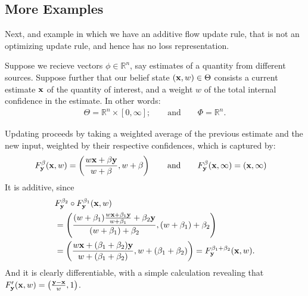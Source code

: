 \begin{subappendices}
    \section{More Examples}


    Next, and example in which we have an additive flow update rule,
    that is not an optimizing update rule, and hence has no loss representation.

    \begin{example}
        Suppose we recieve vectors $\phi \in \mathbb R^n$, 
        say estimates of a quantity from different sources.
        Suppose further that our belief state
        $(\mathbf x,w) \in \Theta$ consists a current estimate
        $\mathbf x$ of the quantity of interest, and a weight $w$ of the total internal confidence in the estimate.
        In other words:    
    	\begin{align*}
    		\Theta = \mathbb R^n \times [0,\infty];
    		\qquad
            \text{and}
            \qquad
    		\Phi = \mathbb R^n %
            .
    	\end{align*}

    	Updating proceeds by taking a weighted average of the previous estimate and the new input, weighted by their respective confidences, which is captured by:
    	\begin{align*}
    		F^\beta_{\mathbf y}(\mathbf x, w) &=  \left( \frac{ w \mathbf x + \beta \mathbf y}{w + \beta} , w + \beta \right)
    		\qquad\text{and}\qquad
    		F^{\beta}_{\mathbf y}(\mathbf x, \infty) = (\mathbf x, \infty)
    	\end{align*}
    	It is additive, since
    	\begin{align*}
    		&F^{\beta_2}_{\mathbf y} \circ F^{\beta_1}_{\mathbf y}(\mathbf x, w) \\
    		&= \left( \frac{ (w + \beta_1) \frac{ w \mathbf x + \beta_1 \mathbf y}{w + \beta_1} + \beta_2 \mathbf y}{(w + \beta_1) + \beta_2}, (w  + \beta_1) + \beta_2 \right) \\
    		&= \left( \frac{  w \mathbf x + (\beta_1 + \beta_2) \mathbf y}{w + (\beta_1 + \beta_2)}, w  + (\beta_1 + \beta_2)\right)
    		= F^{\beta_1 + \beta_2}_{\mathbf y}(\mathbf x, w).
    	\end{align*}
    	And it is clearly differentiable, with a simple calculation revealing that
    	$ F'_{\mathbf y}(\mathbf x, w) = \left( \frac{\mathbf y - \mathbf x}{w}, 1\right) $.


\end{example}
\end{subappendices}
